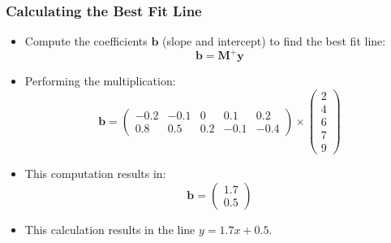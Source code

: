 \documentclass[aspectratio=169]{beamer}
\begin{document}
\begin{frame}
\frametitle{Calculating the Best Fit Line}

\begin{itemize}
    \item \pause Compute the coefficients \( \mathbf{b} \) (slope and intercept) to find the best fit line:
    \[
    \mathbf{b} = \mathbf{M}^+ \mathbf{y}
    \]
    \item \pause Performing the multiplication:
    \[
    \mathbf{b} = \begin{pmatrix}
    -0.2 & -0.1 & 0 & 0.1 & 0.2 \\
    0.8 & 0.5 & 0.2 & -0.1 & -0.4
    \end{pmatrix} \times \begin{pmatrix}
    2 \\
    4 \\
    6 \\
    7 \\
    9
    \end{pmatrix}
    \]
    \item \pause This computation results in:
    \[
    \mathbf{b} = \begin{pmatrix}
    1.7 \\ %
    0.5    %
    \end{pmatrix}
    \]
    \item \pause This calculation results in the line \( y = 1.7x + 0.5 \).
\end{itemize}
\end{frame}
\end{document}
